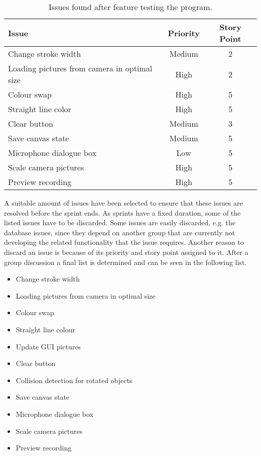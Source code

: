\begin{table}[h]
\begin{tabular}{|p{5cm}|c|c|}
\hline 
Issue & Priority & Story Point \\ 
\hline 
Change stroke width & Medium & 2 \\ 
\hline 
Loading pictures from camera in optimal size & High & 2 \\ 
\hline 
Colour swap & High & 5 \\ 
\hline 
Straight line color & High & 5 \\ 
\hline 
Clear button & Medium & 3 \\ 
\hline 
Save canvas state & Medium & 5 \\ 
\hline 
Microphone dialogue box & Low & 5 \\ 
\hline 
Scale camera pictures & High & 5 \\ 
\hline 
Preview recording & High & 5 \\ 
\hline 
\end{tabular}
\caption{Issues found after feature testing the program.}
\label{table:newissues}
\end{table}

A suitable amount of issues have been selected to ensure that these issues are resolved before the sprint ends.
As sprints have a fixed duration, some of the listed issues have to be discarded.
Some issues are easily discarded, e.g. the database issues, since they depend on another group that are currently not developing the related functionality that the issue requires.
Another reason to discard an issue is because of its priority and story point assigned to it.
After a group discussion a final list is determined and can be seen in the following list.

\begin{itemize}
	\item Change stroke width
	\item Loading pictures from camera in optimal size
	\item Colour swap
	\item Straight line colour
	\item Update GUI pictures
	\item Clear button
	\item Collision detection for rotated objects
	\item Save canvas state
	\item Microphone dialogue box
	\item Scale camera pictures
	\item Preview recording
\end{itemize}